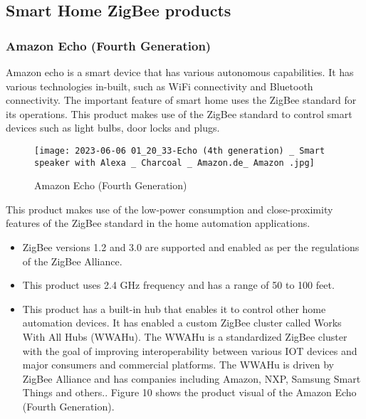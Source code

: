 \documentclass[conference]{IEEEtran}
\begin{document}
\subsection{Smart Home ZigBee products}
\subsubsection{Amazon Echo (Fourth Generation)}
Amazon echo is a smart device that has various autonomous capabilities. It has various technologies in-built, such as WiFi connectivity and Bluetooth connectivity. The important feature of smart home uses the ZigBee standard for its operations. This product makes use of the ZigBee standard to control smart devices such as light bulbs, door locks and plugs. \cite{Amazon_1990}
\begin{figure}
    \centering
    \texttt{[image: 2023-06-06 01\_20\_33-Echo (4th generation) \_ Smart speaker with Alexa \_ Charcoal \_ Amazon.de\_ Amazon .jpg]}
    \caption{Amazon Echo (Fourth Generation)\cite{AmazonEchoImage}}
    \label{Amazon Echo (Fourth Generation)}
\end{figure}

This product makes use of the low-power consumption and close-proximity features of the ZigBee standard in the home automation applications. 
\begin{itemize}
    \item ZigBee versions 1.2 and 3.0 are supported and enabled as per the regulations of the ZigBee Alliance. 
    \item This product uses 2.4 GHz frequency and has a range of 50 to 100 feet.
    \item This product has a built-in hub that enables it to control other home automation devices. It has enabled a custom ZigBee cluster called Works With All Hubs (WWAHu). The WWAHu is a standardized ZigBee cluster with the goal of improving interoperability between various IOT devices and  major consumers and commercial platforms. The WWAHu is driven by  ZigBee Alliance and has companies including Amazon, NXP, Samsung Smart Things and others.\cite{WWAHu}. Figure 10 shows the product visual of the Amazon Echo (Fourth Generation).
\end{itemize}
\end{document}
